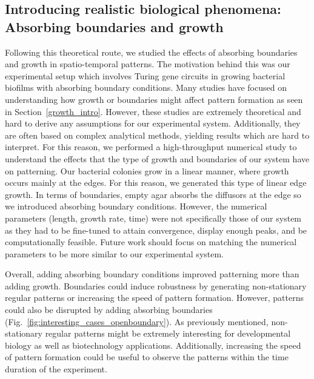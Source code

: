 \subsection*{Introducing realistic biological phenomena: Absorbing boundaries and growth}
Following this theoretical route, we studied the effects of absorbing boundaries and growth in spatio-temporal patterns.
The motivation behind this was our experimental setup which involves Turing gene circuits in growing bacterial biofilms with absorbing boundary conditions.
Many studies have focused on understanding how growth or boundaries might affect pattern formation as seen in Section~\ref{growth_intro}.
However, these studies are extremely theoretical and hard to derive any assumptions for our experimental system.
Additionally, they are often based on complex analytical methods, yielding results which are hard to interpret.
For this reason, we performed a high-throughput numerical study to understand the effects that the type of growth and boundaries of our system have on patterning.
Our bacterial colonies grow in a linear manner, where growth occurs mainly at the edges.
For this reason, we generated this type of linear edge growth.
In terms of boundaries, empty agar absorbs the diffusors at the edge so we introduced absorbing boundary conditions.
However, the numerical parameters (length, growth rate, time) were not specifically those of our system as they had to be fine-tuned to attain convergence, display enough peaks, and be computationally feasible.
Future work should focus on matching the numerical parameters to be more similar to our experimental system.

Overall, adding absorbing boundary conditions improved patterning more than adding growth.
Boundaries could induce robustness by generating non-stationary regular patterns or increasing the speed of pattern formation.
However, patterns could also be disrupted by adding absorbing boundaries (Fig.~\ref{fig:interesting_cases_openboundary}).
As previously mentioned, non-stationary regular patterns might be extremely interesting for developmental biology as well as biotechnology applications.
Additionally, increasing the speed of pattern formation could be useful to observe the patterns within the time duration of the experiment.

